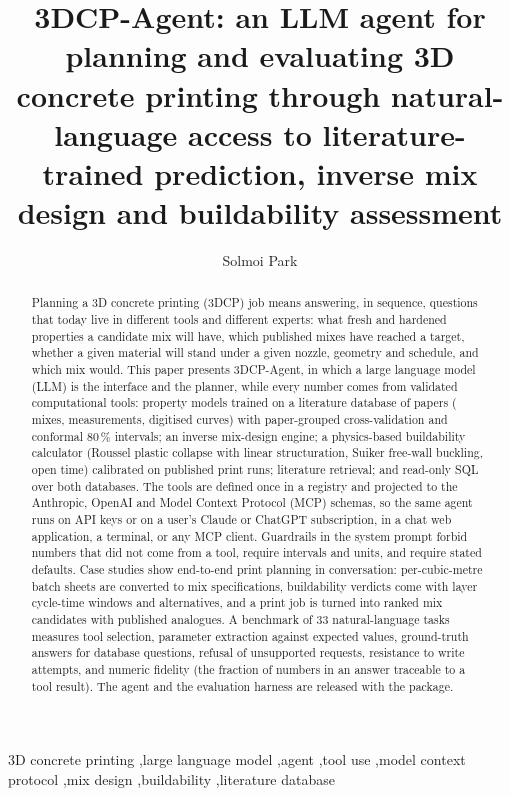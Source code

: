 \documentclass[preprint,12pt]{elsarticle}
\begin{document}
\begin{frontmatter}

\title{3DCP-Agent: an LLM agent for planning and evaluating 3D concrete printing through natural-language access to literature-trained prediction, inverse mix design and buildability assessment}

\author[skku]{Solmoi Park}
\address[skku]{School of Civil, Architectural Engineering and Landscape Architecture, Sungkyunkwan University, Suwon, Republic of Korea}

\begin{abstract}
Planning a 3D concrete printing (3DCP) job means answering, in sequence, questions that today live in different tools and different experts: what fresh and hardened properties a candidate mix will have, which published mixes have reached a target, whether a given material will stand under a given nozzle, geometry and schedule, and which mix would. This paper presents 3DCP-Agent, in which a large language model (LLM) is the interface and the planner, while every number comes from validated computational tools: \nnModels{} property models trained on a literature database of \npapers{} papers (\nmixes{} mixes, \nmeasurements{} measurements, \ncurves{} digitised curves) with paper-grouped cross-validation and conformal 80\,\% intervals; an inverse mix-design engine; a physics-based buildability calculator (Roussel plastic collapse with linear structuration, Suiker free-wall buckling, open time) calibrated on \nprintRuns{} published print runs; literature retrieval; and read-only SQL over both databases. The \nnTools{} tools are defined once in a registry and projected to the Anthropic, OpenAI and Model Context Protocol (MCP) schemas, so the same agent runs on API keys or on a user's Claude or ChatGPT subscription, in a chat web application, a terminal, or any MCP client. Guardrails in the system prompt forbid numbers that did not come from a tool, require intervals and units, and require stated defaults. Case studies show end-to-end print planning in conversation: per-cubic-metre batch sheets are converted to mix specifications, buildability verdicts come with layer cycle-time windows and alternatives, and a print job is turned into ranked mix candidates with published analogues. A benchmark of 33 natural-language tasks measures tool selection, parameter extraction against expected values, ground-truth answers for database questions, refusal of unsupported requests, resistance to write attempts, and numeric fidelity (the fraction of numbers in an answer traceable to a tool result). The agent and the evaluation harness are released with the package.
\end{abstract}

\begin{keyword}
3D concrete printing \sep large language model \sep agent \sep tool use \sep model context protocol \sep mix design \sep buildability \sep literature database
\end{keyword}
\end{frontmatter}
\end{document}
